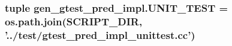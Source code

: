 \hypertarget{namespacegen__gtest__pred__impl_a88e9ea29c82704eab46ccc3e1e3468c8}{
\subsubsection[{U\-N\-I\-T\-\_\-\-T\-E\-S\-T}]{\setlength{\rightskip}{0pt plus 5cm}tuple gen\-\_\-gtest\-\_\-pred\-\_\-impl.\-U\-N\-I\-T\-\_\-\-T\-E\-S\-T = os.\-path.\-join({\bf S\-C\-R\-I\-P\-T\-\_\-\-D\-I\-R}, '../test/gtest\-\_\-pred\-\_\-impl\-\_\-unittest.\-cc')}}\label{namespacegen__gtest__pred__impl_a88e9ea29c82704eab46ccc3e1e3468c8}
